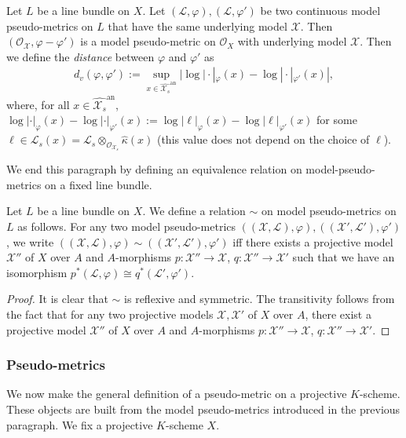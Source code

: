 \documentclass [11pt,reqno]{amsart}
\newcommand{\1}{\mathmybb{1}}
\def\cL{{\mathcal{L}}}
\def\cO{{\mathcal{O}}}
\def\cX{{\mathcal{X}}}
\def\an{\operatorname{an}}
\begin{document}
\begin{definition}
\label{def:distance_local_pseudo-metric}
Let $L$ be a line bundle on $X$. Let $(\cL,\varphi),(\cL,\varphi')$ be two continuous model pseudo-metrics on $L$ that have the same underlying model $\cX$. Then $(\cO_{\cX},\varphi-\varphi')$ is a model pseudo-metric on $\cO_{X}$ with underlying model $\cX$. Then we define the \emph{distance} between $\varphi$ and $\varphi'$ as
\begin{align*}
d_{v}(\varphi,\varphi'):= \displaystyle\sup_{x\in \widehat{\cX_{s}}^{\an}} |\log|\cdot|_{\varphi}(x)-\log|\cdot|_{\varphi'}(x)|,
\end{align*}
where, for all $x\in  \widehat{\cX_{s}}^{\an}$, $\log |\cdot|_{\varphi}(x)-\log|\cdot|_{\varphi'}(x):=\log |\ell|_{\varphi}(x)-\log|\ell|_{\varphi'}(x)$ for some $\ell\in \cL_{s}(x)=\cL_{s}\otimes_{\cO_{\cX_{s}}}\widehat{\kappa}(x)$ (this value does not depend on the choice of $\ell$). 
\end{definition}

We end this paragraph by defining an equivalence relation on model-pseudo-metrics on a fixed line bundle. 

\begin{proposition-definition}
\label{propdef:equivalence_relation_model_pseudo-metrics}
Let $L$ be a line bundle on $X$. We define a relation $\sim$ on model pseudo-metrics on $L$ as follows. For any two model pseudo-metrics $((\cX,\cL),\varphi),((\cX',\cL'),\varphi')$, we write $((\cX,\cL),\varphi)\sim ((\cX',\cL'),\varphi')$ iff there exists a projective model $\cX''$ of $X$ over $A$ and $A$-morphisms $p:\cX''\to \cX$, $q:\cX''\to \cX'$ such that we have an isomorphism $p^{\ast}(\cL,\varphi)\cong q^{\ast}(\cL',\varphi')$.
\end{proposition-definition}

\begin{proof}
It is clear that $\sim$ is reflexive and symmetric. The transitivity follows from the fact that for any two projective models $\cX,\cX'$ of $X$ over $A$, there exist a projective model $\cX''$ of $X$ over $A$ and $A$-morphisms $p:\cX''\to \cX$, $q:\cX''\to \cX'$.
\end{proof}

\subsubsection{Pseudo-metrics}
\label{subsub:pseudo-metric}

We now make the general definition of a pseudo-metric on a projective $K$-scheme. These objects are built from the model pseudo-metrics introduced in the previous paragraph. We fix a projective $K$-scheme $X$.
\end{document}
